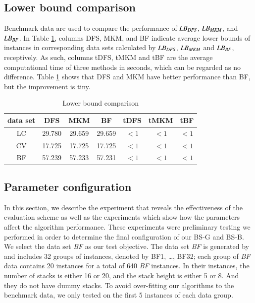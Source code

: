 \documentclass[review,3p,times,authoryear,12pt]{elsarticle}
\begin{document}
\subsection {Lower bound comparison}
Benchmark data are used to compare the performance of $\id{LB}_\id{DFS}$, $\id{LB}_\id{MKM}$, and $\id{LB}_\id{BF}$. In Table \ref{tab:lowerbound}, columns DFS, MKM, and BF indicate average lower bounds of instances in corresponding data sets calculated by $\id{LB}_\id{DFS}$, $\id{LB}_\id{MKM}$ and $\id{LB}_\id{BF}$, receptively. As such, columns tDFS, tMKM and tBF are the average computational time of three methods in seconds, which can be regarded as no difference. Table \ref{tab:lowerbound} shows that DFS and MKM have better performance than BF, but the improvement is tiny.
\begin{table}[htbp]
\centering
\caption{\label{tab:lowerbound} Lower bound comparison}
\begin{tabular}{c|c|c|c|c|c|c}
    \hline
    data set &    DFS     &     MKM   &   BF     & tDFS    & tMKM   & tBF \\
    \hline
    LC       &   29.780   &   29.659  &  29.659  & $<1$    & $<1$   & $<1$ \\
    CV       &   17.725   &   17.725  &  17.725  & $<1$    & $<1$   & $<1$ \\
    BF       &   57.239   &   57.233  &  57.231  & $<1$    & $<1$   & $<1$ \\
    \hline
    \end{tabular}%

\end{table}

\subsection {Parameter configuration}
\label{sub:config}

In this section, we describe the experiment that reveals the effectiveness of the evaluation scheme as well as the experiments which show how the parameters affect the algorithm performance. These experiments were preliminary testing we performed in order to determine the final configuration of our BS-G and BS-B. We select the data set {\em BF} as our test objective. The data set {\em BF} is generated by \cite{BF2012} and includes 32 groups of instances, denoted by BF1, \dots, BF32; each group of {\em BF} data contains 20 instances for a total of 640 {\em BF} instances. In their instances, the number of stacks is either 16 or 20, and the stack height is either 5 or 8. And they do not have dummy stacks. To avoid over-fitting our algorithms to the benchmark data, we only tested on the first 5 instances of each data group.
\end{document}
